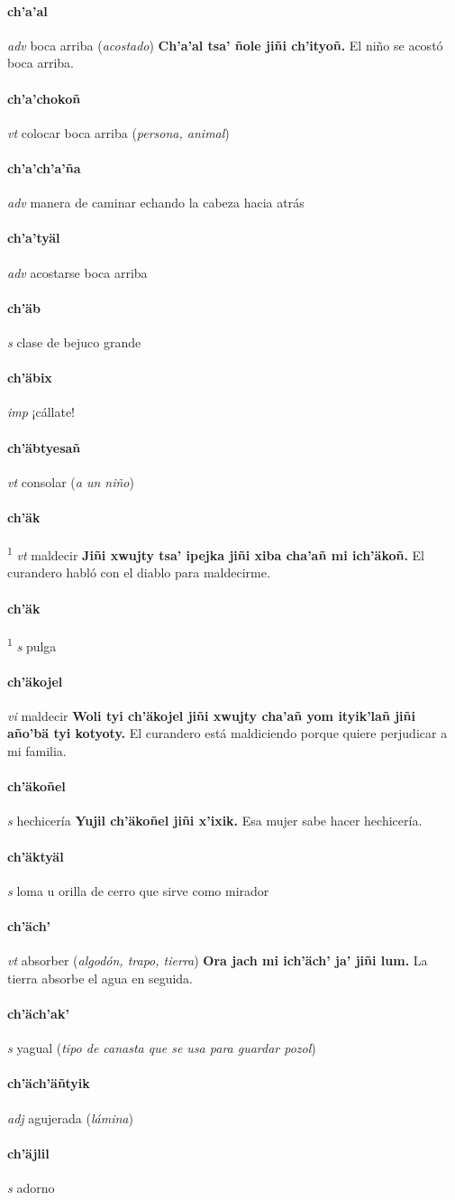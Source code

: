 \documentclass{scrbook}
\newcommand{\entry}[1]{\paragraph{#1}}
\newcommand{\defsuperscript}[1]{\textsuperscript{1}}
\newcommand{\partofspeech}[1]{\textit{#1}}
\newcommand{\spanishtranslation}[1]{#1}
\newcommand{\clarification}[1]{(\textit{#1})}
\newcommand{\cholexample}[1]{\textbf{#1}}
\newcommand{\exampletranslation}[1]{#1}
\begin{document}
\begin{multicols}{2}
\entry{ch'a'al}
\partofspeech{adv}
\spanishtranslation{boca arriba}
\clarification{acostado}
\cholexample{Ch'a'al tsa' ñole jiñi ch'ityoñ.}
\exampletranslation{El niño se acostó boca arriba.}

\entry{ch'a'chokoñ}
\partofspeech{vt}
\spanishtranslation{colocar boca arriba}
\clarification{persona, animal}

\entry{ch'a'ch'a'ña}
\partofspeech{adv}
\spanishtranslation{manera de caminar echando la cabeza hacia atrás}

\entry{ch'a'tyäl}
\partofspeech{adv}
\spanishtranslation{acostarse boca arriba}

\entry{ch'äb}
\partofspeech{s}
\spanishtranslation{clase de bejuco grande}

\entry{ch'äbix}
\partofspeech{imp}
\spanishtranslation{¡cállate!}

\entry{ch'äbtyesañ}
\partofspeech{vt}
\spanishtranslation{consolar}
\clarification{a un niño}

\entry{ch'äk}
\defsuperscript{1}
\partofspeech{vt}
\spanishtranslation{maldecir}
\cholexample{Jiñi xwujty tsa' ipejka jiñi xiba cha'añ mi ich'äkoñ.}
\exampletranslation{El curandero habló con el diablo para maldecirme.}

\entry{ch'äk}
\defsuperscript{2}
\partofspeech{s}
\spanishtranslation{pulga}

\entry{ch'äkojel}
\partofspeech{vi}
\spanishtranslation{maldecir}
\cholexample{Woli tyi ch'äkojel jiñi xwujty cha'añ yom ityik'lañ jiñi año'bä tyi kotyoty.}
\exampletranslation{El curandero está maldiciendo porque quiere perjudicar a mi familia.}

\entry{ch'äkoñel}
\partofspeech{s}
\spanishtranslation{hechicería}
\cholexample{Yujil ch'äkoñel jiñi x'ixik.}
\exampletranslation{Esa mujer sabe hacer hechicería.}

\entry{ch'äktyäl}
\partofspeech{s}
\spanishtranslation{loma u orilla de cerro que sirve como mirador}

\entry{ch'äch'}
\partofspeech{vt}
\spanishtranslation{absorber}
\clarification{algodón, trapo, tierra}
\cholexample{Ora jach mi ich'äch' ja' jiñi lum.}
\exampletranslation{La tierra absorbe el agua en seguida.}

\entry{ch'äch'ak'}
\partofspeech{s}
\spanishtranslation{yagual}
\clarification{tipo de canasta que se usa para guardar pozol}

\entry{ch'äch'äñtyik}
\partofspeech{adj}
\spanishtranslation{agujerada}
\clarification{lámina}

\entry{ch'äjlil}
\partofspeech{s}
\spanishtranslation{adorno}


\end{multicols}
\end{document}
